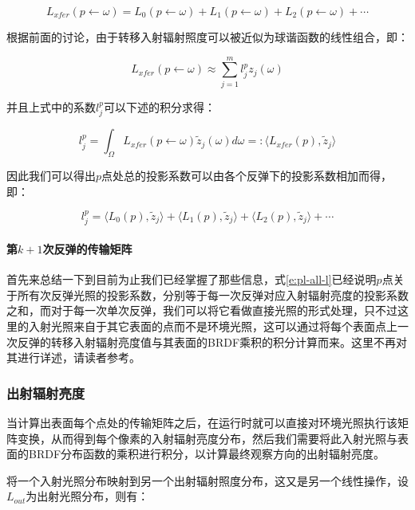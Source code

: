 \begin{equation}
	L_{xfer}(p\leftarrow\omega)=L_{0}(p\leftarrow\omega)+L_{1}(p\leftarrow\omega)+L_{2}(p\leftarrow\omega)+\cdots
\end{equation}

根据前面的讨论，由于转移入射辐射照度可以被近似为球谐函数的线性组合，即：

\begin{equation}
	L_{xfer}(p\leftarrow\omega)\approx\sum^{m}_{j=1}l^{p}_jz_j(\omega)
\end{equation}

\noindent 并且上式中的系数$l^{p}_j$可以下述的积分求得：

\begin{equation}
	l_j^{p}=\int_\Omega L_{xfer}(p\leftarrow\omega)\tilde{z}_j(\omega)d\omega=:\langle L_{xfer}(p),\tilde{z}_j\rangle
\end{equation}


\noindent 因此我们可以得出$p$点处总的投影系数可以由各个反弹下的投影系数相加而得，即：

\begin{equation}\label{e:pl-all-l}
	l^{p}_j=\langle L_0(p),\tilde{z}_j\rangle+\langle L_1(p),\tilde{z}_j\rangle+\langle L_2(p),\tilde{z}_j\rangle+\cdots
\end{equation}



\paragraph{第$k+1$次反弹的传输矩阵}
首先来总结一下到目前为止我们已经掌握了那些信息，式\ref{e:pl-all-l}已经说明$p$点关于所有次反弹光照的投影系数，分别等于每一次反弹对应入射辐射亮度的投影系数之和，而对于每一次单次反弹，我们可以将它看做直接光照的形式处理，只不过这里的入射光照来自于其它表面的点而不是环境光照，这可以通过将每个表面点上一次反弹的转移入射辐射亮度值与其表面的BRDF乘积的积分计算而来。这里不再对其进行详述，请读者参考\cite{a:PrecomputedRadianceTransfer:TheoryandPractice}。




\subsubsection{出射辐射亮度}
当计算出表面每个点处的传输矩阵之后，在运行时就可以直接对环境光照执行该矩阵变换，从而得到每个像素的入射辐射亮度分布，然后我们需要将此入射光照与表面的BRDF分布函数的乘积进行积分，以计算最终观察方向的出射辐射亮度。

将一个入射光照分布映射到另一个出射辐射照度分布，这又是另一个线性操作，设$L_{out}$为出射光照分布，则有：

